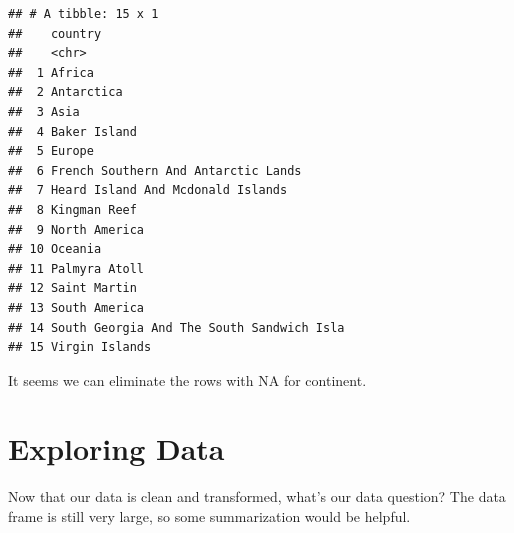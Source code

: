\documentclass[
]{book}
\newenvironment{Shaded}{\begin{snugshade}}{\end{snugshade}}
\newcommand{\CommentTok}[1]{\textcolor[rgb]{0.56,0.35,0.01}{\textit{#1}}}
\newcommand{\DataTypeTok}[1]{\textcolor[rgb]{0.13,0.29,0.53}{#1}}
\newcommand{\KeywordTok}[1]{\textcolor[rgb]{0.13,0.29,0.53}{\textbf{#1}}}
\newcommand{\NormalTok}[1]{#1}
\newcommand{\OperatorTok}[1]{\textcolor[rgb]{0.81,0.36,0.00}{\textbf{#1}}}
\newcommand{\OtherTok}[1]{\textcolor[rgb]{0.56,0.35,0.01}{#1}}
\newcommand{\StringTok}[1]{\textcolor[rgb]{0.31,0.60,0.02}{#1}}
\begin{document}
\begin{verbatim}
## # A tibble: 15 x 1
##    country                                  
##    <chr>                                    
##  1 Africa                                   
##  2 Antarctica                               
##  3 Asia                                     
##  4 Baker Island                             
##  5 Europe                                   
##  6 French Southern And Antarctic Lands      
##  7 Heard Island And Mcdonald Islands        
##  8 Kingman Reef                             
##  9 North America                            
## 10 Oceania                                  
## 11 Palmyra Atoll                            
## 12 Saint Martin                             
## 13 South America                            
## 14 South Georgia And The South Sandwich Isla
## 15 Virgin Islands
\end{verbatim}

It seems we can eliminate the rows with NA for continent.

\begin{Shaded}
\end{Shaded}

\hypertarget{exploring-data}{%
\section{Exploring Data}\label{exploring-data}}

Now that our data is clean and transformed, what's our data question? The data frame is still very large, so some summarization would be helpful.

\begin{Shaded}
\end{Shaded}
\end{document}
